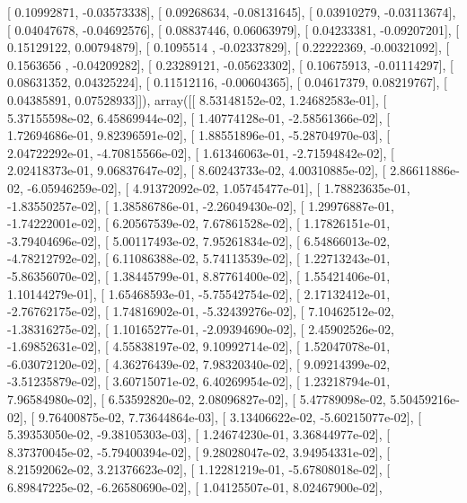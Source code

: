 \documentclass{article}
\begin{document}
       [ 0.10992871, -0.03573338],
       [ 0.09268634, -0.08131645],
       [ 0.03910279, -0.03113674],
       [ 0.04047678, -0.04692576],
       [ 0.08837446,  0.06063979],
       [ 0.04233381, -0.09207201],
       [ 0.15129122,  0.00794879],
       [ 0.1095514 , -0.02337829],
       [ 0.22222369, -0.00321092],
       [ 0.1563656 , -0.04209282],
       [ 0.23289121, -0.05623302],
       [ 0.10675913, -0.01114297],
       [ 0.08631352,  0.04325224],
       [ 0.11512116, -0.00604365],
       [ 0.04617379,  0.08219767],
       [ 0.04385891,  0.07528933]]), array([[  8.53148152e-02,   1.24682583e-01],
       [  5.37155598e-02,   6.45869944e-02],
       [  1.40774128e-01,  -2.58561366e-02],
       [  1.72694686e-01,   9.82396591e-02],
       [  1.88551896e-01,  -5.28704970e-03],
       [  2.04722292e-01,  -4.70815566e-02],
       [  1.61346063e-01,  -2.71594842e-02],
       [  2.02418373e-01,   9.06837647e-02],
       [  8.60243733e-02,   4.00310885e-02],
       [  2.86611886e-02,  -6.05946259e-02],
       [  4.91372092e-02,   1.05745477e-01],
       [  1.78823635e-01,  -1.83550257e-02],
       [  1.38586786e-01,  -2.26049430e-02],
       [  1.29976887e-01,  -1.74222001e-02],
       [  6.20567539e-02,   7.67861528e-02],
       [  1.17826151e-01,  -3.79404696e-02],
       [  5.00117493e-02,   7.95261834e-02],
       [  6.54866013e-02,  -4.78212792e-02],
       [  6.11086388e-02,   5.74113539e-02],
       [  1.22713243e-01,  -5.86356070e-02],
       [  1.38445799e-01,   8.87761400e-02],
       [  1.55421406e-01,   1.10144279e-01],
       [  1.65468593e-01,  -5.75542754e-02],
       [  2.17132412e-01,  -2.76762175e-02],
       [  1.74816902e-01,  -5.32439276e-02],
       [  7.10462512e-02,  -1.38316275e-02],
       [  1.10165277e-01,  -2.09394690e-02],
       [  2.45902526e-02,  -1.69852631e-02],
       [  4.55838197e-02,   9.10992714e-02],
       [  1.52047078e-01,  -6.03072120e-02],
       [  4.36276439e-02,   7.98320340e-02],
       [  9.09214399e-02,  -3.51235879e-02],
       [  3.60715071e-02,   6.40269954e-02],
       [  1.23218794e-01,   7.96584980e-02],
       [  6.53592820e-02,   2.08096827e-02],
       [  5.47789098e-02,   5.50459216e-02],
       [  9.76400875e-02,   7.73644864e-03],
       [  3.13406622e-02,  -5.60215077e-02],
       [  5.39353050e-02,  -9.38105303e-03],
       [  1.24674230e-01,   3.36844977e-02],
       [  8.37370045e-02,  -5.79400394e-02],
       [  9.28028047e-02,   3.94954331e-02],
       [  8.21592062e-02,   3.21376623e-02],
       [  1.12281219e-01,  -5.67808018e-02],
       [  6.89847225e-02,  -6.26580690e-02],
       [  1.04125507e-01,   8.02467900e-02],
\end{document}

